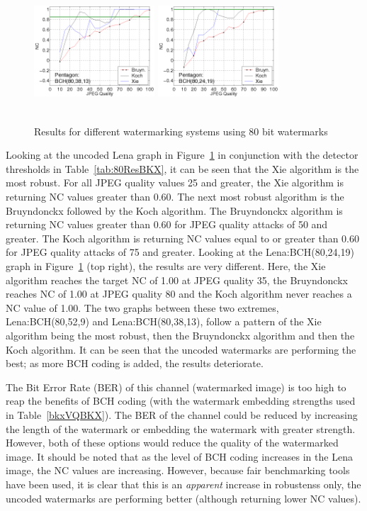 \documentclass[10pt,twocolumn]{article}
\begin{document}
\begin{figure}[!htb]
{{        \includegraphics[height=4.5cm,width=4.5cm]{Pentagon80_38_13.png}
        \includegraphics[height=4.5cm,width=4.5cm]{Pentagon80_24_19.png}
}} 
        \caption{Results for different watermarking systems using 80 bit watermarks}
        \label{fig:80BKX}
\setlength{\abovecaptionskip}{0cm}
\end{figure}
Looking at the uncoded Lena graph in Figure~\ref{fig:80BKX} in 
conjunction with the detector thresholds in Table~\ref{tab:80ResBKX}, it can be seen that the Xie algorithm is the 
most robust. For all JPEG quality values 25 and greater, the Xie algorithm is returning
NC values greater than 0.60. The next most robust algorithm is the Bruyndonckx followed by the Koch algorithm. 
The Bruyndonckx algorithm is returning NC values greater than 0.60 for JPEG quality attacks of 50 and greater.
The Koch algorithm is returning NC values equal to or greater than 0.60 for JPEG quality attacks of 75 and greater.
Looking at the Lena:BCH(80,24,19) graph in Figure~\ref{fig:80BKX} (top right), the results are very different. Here, the 
Xie algorithm reaches the target NC of 1.00 at JPEG quality 35, the Bruyndonckx reaches NC of 1.00 at JPEG quality 80
and the Koch algorithm never reaches a NC value of 1.00. The two graphs between these two extremes, Lena:BCH(80,52,9)
and Lena:BCH(80,38,13), follow a pattern of the Xie algorithm being the most robust, then the Bruyndonckx algorithm and then
the Koch algorithm. It can be seen that the uncoded watermarks are performing the best; as more BCH coding is added,
the results deteriorate. 

The Bit Error Rate (BER) of this channel (watermarked image) is too high to reap the benefits of BCH coding
(with the watermark embedding strengths used in Table~\ref{bkxVQBKX}). 
The BER of the channel could be reduced by increasing the length of the watermark or embedding the watermark with
greater strength. However, both of these options would reduce the quality of the watermarked image.
It should be noted that as the level of BCH coding increases in the Lena image,
the NC values are increasing. However, because fair benchmarking tools have been used, it is clear that this is an \emph{apparent}
increase in robustenss only, the uncoded watermarks are performing better (although returning lower NC values).
\end{document}
